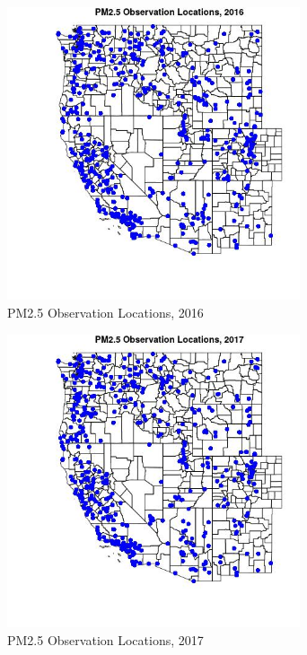 \begin{figure} 
\centering  
\includegraphics[width=0.77\textwidth]{Code_Outputs/Report_PM25_Step4_part_e_de_duplicated_aves_prioritize_24hr_obs_ML_input_PlotLoc2016.jpg} 
\caption{\label{fig:Report_PM25_Step4_part_e_de_duplicated_aves_prioritize_24hr_obs_ML_inputPlotLoc2016}PM2.5 Observation Locations, 2016} 
\end{figure} 
 

\begin{figure} 
\centering  
\includegraphics[width=0.77\textwidth]{Code_Outputs/Report_PM25_Step4_part_e_de_duplicated_aves_prioritize_24hr_obs_ML_input_PlotLoc2017.jpg} 
\caption{\label{fig:Report_PM25_Step4_part_e_de_duplicated_aves_prioritize_24hr_obs_ML_inputPlotLoc2017}PM2.5 Observation Locations, 2017} 
\end{figure} 
 

